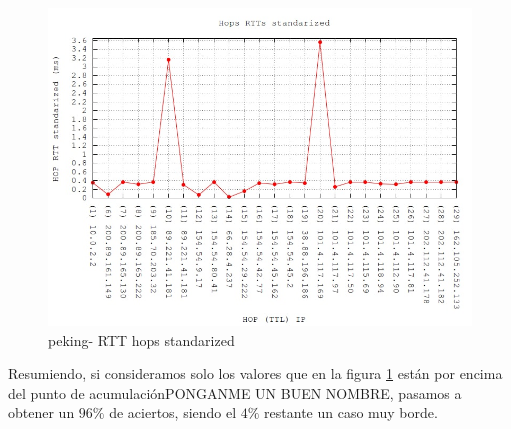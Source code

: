 \begin{figure}[!htbp]
  \centering
    \includegraphics[scale=0.5]{imagenes/peking-graficos/traceroute-peking-standarized.jpg}
  \caption{peking- RTT hops standarized}
  \label{fig:11}
\end{figure}

Resumiendo, si consideramos solo los valores que en la figura \ref{fig:11} están por encima del punto de acumulaciónPONGANME UN BUEN NOMBRE, pasamos a obtener un $96\%$ de aciertos, siendo el $4\%$ restante un caso muy borde.
